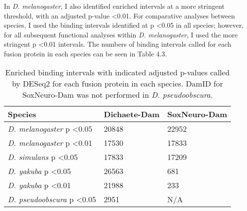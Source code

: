 In \emph{D. melanogaster}, I also identified enriched intervals at a more stringent threshold, with an adjusted p-value \textless 0.01. For comparative analyses between species, I used the binding intervals identified at p \textless 0.05 in all species; however, for all subsequent functional analyses within \emph{D. melanogaster}, I used the more stringent p \textless 0.01 intervals. The numbers of binding intervals called for each fusion protein in each species can be seen in Table 4.3.\\

\begin{table}[h]
\centering
\begin{tabular}{|l|l|l|}
\hline
\textbf{Species}                           & \textbf{Dichaete-Dam} & \textbf{SoxNeuro-Dam} \\ \hline
\emph{D. melanogaster} p \textless 0.05  & 20848        & 22952        \\ \hline
\emph{D. melanogaster} p \textless 0.01  & 17530        & 17833        \\ \hline
\emph{D. simulans} p \textless 0.05      & 17833        & 17209        \\ \hline
\emph{D. yakuba} p \textless 0.05        & 26563        & 681          \\ \hline
\emph{D. yakuba} p \textless 0.01        & 21988        & 233          \\ \hline
\emph{D. pseudoobscura} p \textless 0.05 & 2951         & N/A          \\ \hline
\end{tabular}
\caption{Enriched binding intervals with indicated adjusted p-values called by DESeq2 for each fusion protein in each species. DamID for SoxNeuro-Dam was not performed in \emph{D. pseudoobscura}.}
\label{Table 4.3}
\end{table}


